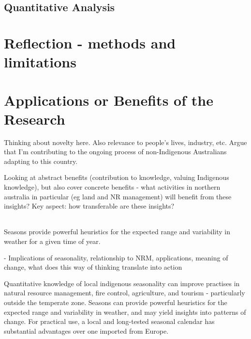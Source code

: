 \subsection{Quantitative Analysis}




\section{Reflection - methods and limitations}
\label{sec:disc-reflection}









\section{Applications or Benefits of the Research}
\label{sec:applications-benefits}

Thinking about novelty here.  Also relevance to people's lives,
industry, etc.  Argue that I'm contributing to the ongoing process
of non-Indigenous Australians adapting to this country.

Looking at abstract benefits (contribution to knowledge, valuing Indigenous knowledge),
but also cover concrete benefits - what activities in northern australia
in particular (eg land and NR management) will benefit from these insights?
Key aspect: how transferable are these insights?

~\\

Seasons provide powerful heuristics for the expected range and variability in
weather for a given time of year.

-	Implications of seasonality, relationship to NRM, applications, meaning of
change, what does this way of thinking translate into action


Quantitative knowledge of local indigenous seasonality can improve practises in
natural resource management, fire control, agriculture, and tourism -
particularly outside the temperate zone.  Seasons can provide powerful
heuristics for the expected range and variability in weather, and may yield
insights into patterns of change.  For practical use, a local and long-tested
seasonal calendar has substantial advantages over one imported from Europe.



